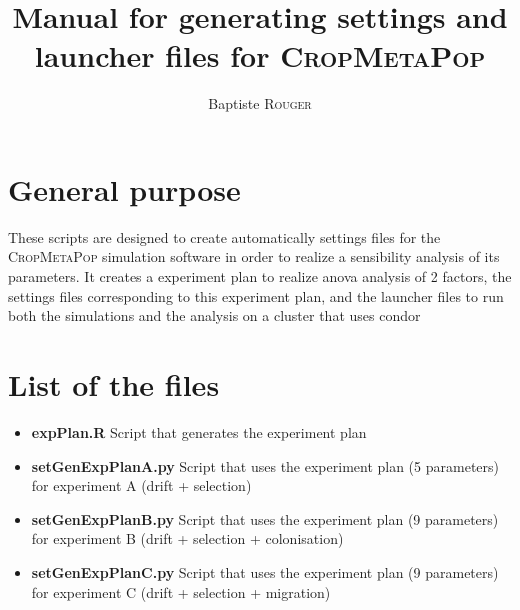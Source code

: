 \documentclass[10pt,a4paper]{article}
\title{Manual for generating settings and launcher files for \textsc{CropMetaPop}}
\author{Baptiste \textsc{Rouger}}
\begin{document}
\maketitle
\section{General purpose}
These scripts are designed to create automatically settings files for the \textsc{CropMetaPop} simulation software in order to realize a sensibility analysis of its parameters.
It creates a experiment plan to realize anova analysis of 2 factors, the settings files corresponding to this experiment plan, and the launcher files to run both the simulations and the analysis on a cluster that uses condor 


\section{List of the files}
\begin{itemize}
        \item \textbf{expPlan.R} Script that generates the experiment plan
        \item \textbf{setGenExpPlanA.py} Script that uses the experiment plan (5 parameters) for experiment A (drift + selection)
        \item \textbf{setGenExpPlanB.py} Script that uses the experiment plan (9 parameters) for experiment B (drift + selection + colonisation)
        \item \textbf{setGenExpPlanC.py} Script that uses the experiment plan (9 parameters) for experiment C (drift + selection + migration)
    \end{itemize}
\end{document}
